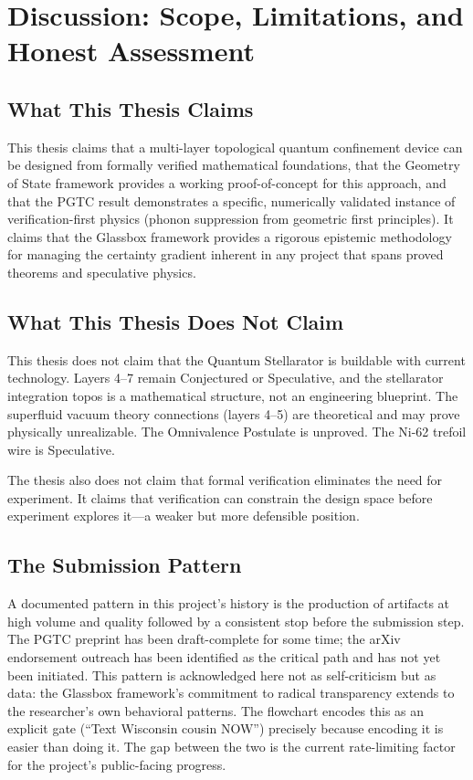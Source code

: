 \documentclass[12pt,letterpaper]{report}
\begin{document}

\chapter{Discussion: Scope, Limitations, and Honest Assessment}

\section{What This Thesis Claims}

This thesis claims that a multi-layer topological quantum confinement device can be designed from formally verified mathematical foundations, that the Geometry of State framework provides a working proof-of-concept for this approach, and that the PGTC result demonstrates a specific, numerically validated instance of verification-first physics (phonon suppression from geometric first principles). It claims that the Glassbox framework provides a rigorous epistemic methodology for managing the certainty gradient inherent in any project that spans proved theorems and speculative physics.

\section{What This Thesis Does Not Claim}

This thesis does not claim that the Quantum Stellarator is buildable with current technology. Layers 4--7 remain Conjectured or Speculative, and the stellarator integration topos is a mathematical structure, not an engineering blueprint. The superfluid vacuum theory connections (layers 4--5) are theoretical and may prove physically unrealizable. The Omnivalence Postulate is unproved. The Ni-62 trefoil wire is Speculative.

The thesis also does not claim that formal verification eliminates the need for experiment. It claims that verification can constrain the design space before experiment explores it---a weaker but more defensible position.

\section{The Submission Pattern}

A documented pattern in this project's history is the production of artifacts at high volume and quality followed by a consistent stop before the submission step. The PGTC preprint has been draft-complete for some time; the arXiv endorsement outreach has been identified as the critical path and has not yet been initiated. This pattern is acknowledged here not as self-criticism but as data: the Glassbox framework's commitment to radical transparency extends to the researcher's own behavioral patterns. The flowchart encodes this as an explicit gate (``Text Wisconsin cousin NOW'') precisely because encoding it is easier than doing it. The gap between the two is the current rate-limiting factor for the project's public-facing progress.
\end{document}

